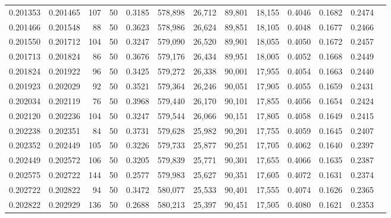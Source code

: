 \begin{tabular}{rrrrrrrrrrrrr}
0.201353 & 0.201465 &   107 &  50 &                                     0.3185 & 578,898 &  26,712 &  89,801 &  18,155 & 0.4046 & 0.1682 & 0.2474 \\
0.201466 & 0.201548 &    88 &  50 &                                     0.3623 & 578,986 &  26,624 &  89,851 &  18,105 & 0.4048 & 0.1677 & 0.2466 \\
0.201550 & 0.201712 &   104 &  50 &                                     0.3247 & 579,090 &  26,520 &  89,901 &  18,055 & 0.4050 & 0.1672 & 0.2457 \\
0.201713 & 0.201824 &    86 &  50 &                                     0.3676 & 579,176 &  26,434 &  89,951 &  18,005 & 0.4052 & 0.1668 & 0.2449 \\
0.201824 & 0.201922 &    96 &  50 &                                     0.3425 & 579,272 &  26,338 &  90,001 &  17,955 & 0.4054 & 0.1663 & 0.2440 \\
0.201923 & 0.202029 &    92 &  50 &                                     0.3521 & 579,364 &  26,246 &  90,051 &  17,905 & 0.4055 & 0.1659 & 0.2431 \\
0.202034 & 0.202119 &    76 &  50 &                                     0.3968 & 579,440 &  26,170 &  90,101 &  17,855 & 0.4056 & 0.1654 & 0.2424 \\
0.202120 & 0.202236 &   104 &  50 &                                     0.3247 & 579,544 &  26,066 &  90,151 &  17,805 & 0.4058 & 0.1649 & 0.2415 \\
0.202238 & 0.202351 &    84 &  50 &                                     0.3731 & 579,628 &  25,982 &  90,201 &  17,755 & 0.4059 & 0.1645 & 0.2407 \\
0.202352 & 0.202449 &   105 &  50 &                                     0.3226 & 579,733 &  25,877 &  90,251 &  17,705 & 0.4062 & 0.1640 & 0.2397 \\
0.202449 & 0.202572 &   106 &  50 &                                     0.3205 & 579,839 &  25,771 &  90,301 &  17,655 & 0.4066 & 0.1635 & 0.2387 \\
0.202575 & 0.202722 &   144 &  50 &                                     0.2577 & 579,983 &  25,627 &  90,351 &  17,605 & 0.4072 & 0.1631 & 0.2374 \\
0.202722 & 0.202822 &    94 &  50 &                                     0.3472 & 580,077 &  25,533 &  90,401 &  17,555 & 0.4074 & 0.1626 & 0.2365 \\
0.202822 & 0.202929 &   136 &  50 &                                     0.2688 & 580,213 &  25,397 &  90,451 &  17,505 & 0.4080 & 0.1621 & 0.2353 \\

\end{tabular}

